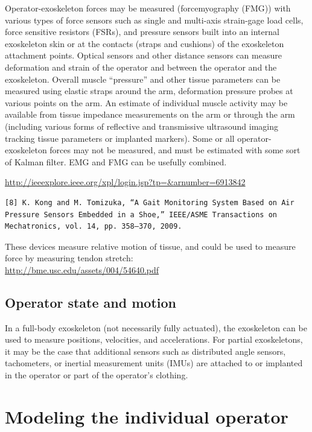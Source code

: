 \documentclass[letterpaper,12pt,fullpage]{article}
\begin{document}
Operator-exoskeleton forces may be measured (forcemyography (FMG))
with various types of
force sensors such as single and multi-axis strain-gage load cells,
force sensitive resistors (FSRs), and pressure sensors built into an internal exoskeleton skin or at the
contacts (straps and cushions) of the exoskeleton attachment points.
Optical sensors and other distance sensors can measure deformation and
strain of the operator and between the operator and the exoskeleton.
Overall muscle ``pressure'' and other tissue parameters can be measured using
elastic straps around the arm, deformation pressure probes at various
points on the arm.
An estimate of individual muscle activity
may be available from tissue impedance measurements on the arm
or through the arm (including various forms of reflective and transmissive
ultrasound imaging tracking tissue parameters or implanted markers).
Some or all operator-exoskeleton forces may not be measured, and must
be estimated with some sort of Kalman filter.
EMG and FMG can be usefully combined.

\url{http://ieeexplore.ieee.org/xpl/login.jsp?tp=&arnumber=6913842}\\

\begin{verbatim}
[8] K. Kong and M. Tomizuka, “A Gait Monitoring System Based on Air
Pressure Sensors Embedded in a Shoe,” IEEE/ASME Transactions on
Mechatronics, vol. 14, pp. 358–370, 2009.
\end{verbatim}

These devices measure relative motion of tissue, and could be used
to measure force by measuring tendon stretch:\\
\url{http://bme.usc.edu/assets/004/54640.pdf}

\subsection{Operator state and motion}

In a full-body exoskeleton
(not necessarily fully actuated), the
exoskeleton can be used to measure positions, velocities,
and accelerations. For partial exoskeletons,
it may be the case that additional sensors such as distributed 
angle sensors, tachometers, or inertial measurement units (IMUs)
are attached to or implanted in the operator 
or part of the operator's clothing.

\section{Modeling the individual operator}
\end{document}
